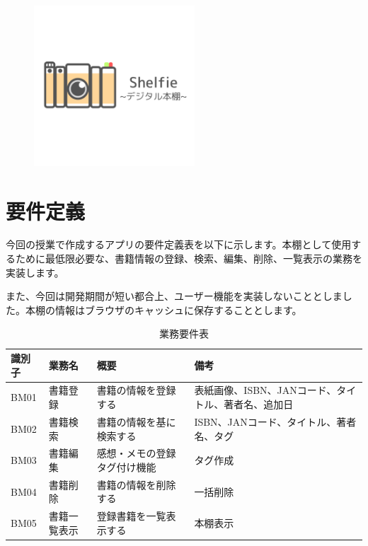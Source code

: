 \documentclass[a4paper, 11pt, titlepage]{jsarticle}
\begin{document}
\begin{figure}[htbp]
\centering
\includegraphics[width=60mm] {shelfie_logo2.png}
\label{fig:func}
\end{figure}
\clearpage
\section{要件定義}
今回の授業で作成するアプリの要件定義表を以下に示します。本棚として使用するために最低限必要な、書籍情報の登録、検索、編集、削除、一覧表示の業務を実装します。

また、今回は開発期間が短い都合上、ユーザー機能を実装しないこととしました。本棚の情報はブラウザのキャッシュに保存することとします。

\begin{table}[htbp]
  \centering
  \begin{tabular}{|l|l|>{\centering\arraybackslash}m{4cm}|>{\centering\arraybackslash}m{5cm}|}
    \hline
    \textbf{識別子} & \textbf{業務名} & \textbf{概要} & \textbf{備考} \\
    \hline\hline
    BM01 & 書籍登録 & 書籍の情報を登録する & 表紙画像、ISBN、JANコード、タイトル、著者名、追加日 \\
    \hline
    BM02 & 書籍検索 & 書籍の情報を基に検索する & ISBN、JANコード、タイトル、著者名、タグ \\
    \hline
    BM03 & 書籍編集 & 感想・メモの登録タグ付け機能 & タグ作成 \\
    \hline
    BM04 & 書籍削除 & 書籍の情報を削除する & 一括削除 \\
    \hline
    BM05 & 書籍一覧表示 & 登録書籍を一覧表示する & 本棚表示 \\
    \hline
  \end{tabular}
  \caption{業務要件表}
  \label{tab:requirements}
\end{table}
\end{document}
